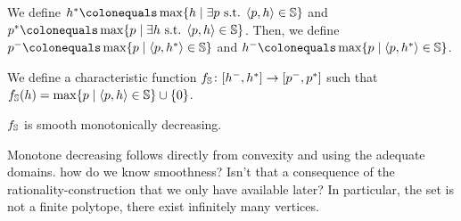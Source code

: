 {{{{\begin{definition}
We define 
$\rndopt \colonequals \max \{ \rndp \mid \exists \scp \text{ s.t. } \langle \scp, \rndp \rangle \in \solutions  \} $
and 
$\scopt \colonequals \max \{ \scp \mid \exists \rndp \text{ s.t. } \langle \scp, \rndp \rangle \in \solutions  \} $.
Then, we define 
$\scmin \colonequals \max \{ \scp \mid \langle \scp, \rndopt \rangle  \in \solutions \}$ and $\rndmin \colonequals \max \{ \scp \mid \langle \scp, \rndopt \rangle  \in \solutions \}$.
\end{definition}





We define a characteristic function $f_\mathbb{S}\colon [h^{-},h^{*}] \rightarrow [p^{-},p^{*}]$ such that $f_\mathbb{S}(h) = \max \{ p \mid \langle p, h \rangle \in \mathbb{S} \} \cup \{ 0 \}$.  
\begin{proposition}
	$f_\mathbb{S}$ is smooth monotonically decreasing. 
\end{proposition}
Monotone decreasing follows directly from convexity and using the adequate domains. 
{\color{red}how do we know smoothness? Isn't that a consequence of the rationality-construction that we only have available later?}
In particular, the set is not a finite polytope, there exist infinitely many vertices.


 
\begin{figure}
\centering
\begin{subfigure}{0.2\columnwidth}
\centering
{}
\caption{}
\end{subfigure}
\begin{subfigure}{0.38\columnwidth}
\centering
{}
\caption{}
\end{subfigure}
\begin{subfigure}{0.38\columnwidth}
\centering
{}
\caption{}
\end{subfigure}


\end{figure}}}}}
